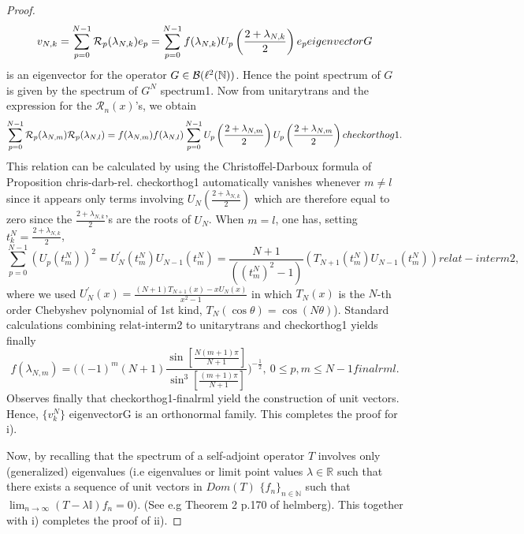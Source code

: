 \documentclass[10pt]{book}
\theoremstyle{break}
\begin{document}
\begin{proof}
\begin{equation}
v_{N,k}=\sum_{p=0}^{N-1}{\cal{R}}_{p}(\lambda_{N,k})e_p=\sum_{p=0}^{N-1}f(\lambda_{N,k})U_p\left({\frac{2+\lambda_{N,k}}{2}}\right)e_p{eigenvectorG}
\end{equation}
is an eigenvector for the operator $G\in{\cal{B}}(\ell^2(\mathbb{N}))$. Hence the point spectrum of $G$ is given by the spectrum of $G^N$ {spectrum1}. Now from {unitarytrans} and the expression for the $\mathcal{R}_n(x)$'s, we obtain 
\begin{equation}
\sum_{p=0}^{N-1}{\cal{R}}_p(\lambda_{N,m}){\cal{R}}_p(\lambda_{N,l})=f(\lambda_{N,m})f(\lambda_{N,l})\sum_{p=0}^{N-1}
U_p\left(\frac{2+\lambda_{N,m}}{2}\right)U_p\left(\frac{2+\lambda_{N,m}}{2}\right){checkorthog1}.
\end{equation}
This relation can be calculated by using the Christoffel-Darboux formula of Proposition {chris-darb-rel}. {checkorthog1} automatically vanishes whenever $m\ne l$ since it appears only terms involving $U_N({\frac{2+\lambda_{N,k}}{2}})$ which are therefore equal to zero since the ${\frac{2+\lambda_{N,k}}{2}}$'s are the roots of $U_N$. When $m=l$, one has, setting $t^N_k={\frac{2+\lambda_{N,k}}{2}}$,
\begin{equation}
\sum_{p=0}^{N-1}(U_p(t^N_m))^2=U_N^\prime(t^N_m)U_{N-1}(t^N_m)={\frac{N+1}{((t^N_m)^2-1)}}(T_{N+1}(t^N_m)U_{N-1}(t^N_m)){relat-interm2},
\end{equation}
where we used $U^\prime_N(x)={\frac{(N+1)T_{N+1}(x)-xU_N(x) }{x^2-1 }}$ in which $T_N(x)$ is the $N$-th order Chebyshev polynomial of 1st kind, $T_N(\cos\theta)=\cos(N\theta)$). Standard calculations combining {relat-interm2} to {unitarytrans} and {checkorthog1} yields finally
\begin{equation}
f(\lambda_{N,m})=\bigg((-1)^m(N+1){\frac{ \sin[{\frac{N(m+1)\pi }{N+1 }}  ]}{\sin^3[{\frac{(m+1)\pi }{N+1 }} ] }} \bigg)^{-{\frac12}},\ 0\le p,m\le N-1{finalrml}.
\end{equation}
Observes finally that {checkorthog1}-{finalrml} yield the construction of unit vectors. Hence, $\{v^N_k\}$ {eigenvectorG} is an orthonormal family. This completes the proof for i). \par
Now, by recalling that the spectrum of a self-adjoint operator $T$ involves only (generalized) eigenvalues (i.e eigenvalues or limit point values $\lambda\in\mathbb{R}$ such that there exists a sequence of unit vectors in $Dom(T)$ $\{f_n\}_{n\in\mathbb{N}}$ such that $\lim_{n\to\infty}(T-\lambda\mathbb{I})f_n=0$). (See e.g Theorem 2 p.170 of {helmberg}). This together with i) completes the proof of ii).
\end{proof}
\end{document}
